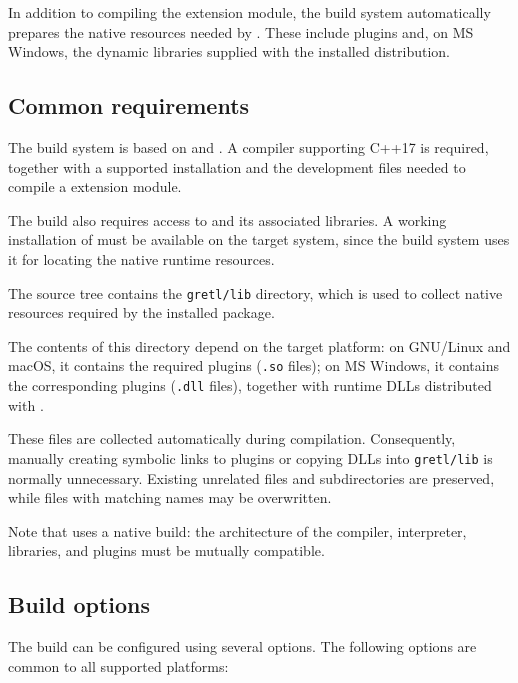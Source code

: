 In addition to compiling the extension module, the build system
automatically prepares the native \gretl resources needed by
\gretlpy. These include \gretl plugins and, on MS Windows,
the dynamic libraries supplied with the installed \gretl
distribution.


\subsection{Common requirements}
The \gretlpy build system is based on  and .
A \cpp compiler supporting C++17 is required, together with a
supported \python installation and the development files needed
to compile a \python extension module.

The build also requires access to \lgretl and its associated
libraries. A working installation of \gretl must be available
on the target system, since the build system uses it for locating
the native runtime resources.

The \gretlpy source tree contains the \texttt{gretl/lib}
directory, which is used to collect native resources
required by the installed package.

The contents of this directory depend on the target platform:
on GNU/Linux and macOS, it contains the required \gretl plugins
(\texttt{.so} files); on MS Windows, it contains the corresponding
plugins (\texttt{.dll} files), together with runtime DLLs
distributed with \gretl.

These files are collected automatically during compilation.
Consequently, manually creating symbolic links to plugins or
copying DLLs into \texttt{gretl/lib} is normally unnecessary.
Existing unrelated files and subdirectories are preserved,
while files with matching names may be overwritten.

Note that \gretlpy uses a native build: the architecture of the
compiler, \python interpreter, \lgretl libraries, and plugins
must be mutually compatible.


\subsection{Build options}
The build can be configured using several  options.
The following options are common to all supported platforms:


